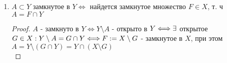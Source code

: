 \begin{theorem-non}
\begin{enumerate}
\begin{proof}
\begin{center}
                    $G\cap Y = \underset{a\in A}{\cup}(B_{r_a}^X(a) \cap Y) \subset A \Longrightarrow G\cap Y \subset A$
                \end{center}
                Доказали "$\Longrightarrow$". Теперь докажем "$\Longleftarrow$"\\
                $G$ - открыто в $Y$. Доказать, что $A := G\cap Y$ - открыто в $Y$
                $a \in A \Longrightarrow a \in G$, $G$ - открыто$ \Longrightarrow \exists r>0 : B_r^X(a) \subset G \Longrightarrow B_r^X(a)\cap Y = B_r^Y(a) \subset G\cap Y$, то есть $A$ открыто в $Y$.
            \end{proof}
            \item $A \subset Y$ замкнутое в $Y \Longleftrightarrow$ найдется замкнутое множество $F \in X $, т. ч $A = F\cap Y$
            \begin{proof}
                $A$ - замкнуто в $Y \Longleftrightarrow Y\setminus A$ - открыто в $Y \Longleftrightarrow \\
                \exists$ открытое $G \in X : Y\setminus A = G\cap Y \Longleftrightarrow \\
                F := X\setminus G$ - замкнутое в $X$, при этом $A = Y\setminus (G\cap Y) = Y\cap (X\setminus G)$ \vspace*{0,2cm}\\
                 \par
            \end{proof}
        \end{enumerate}
    \end{theorem-non}